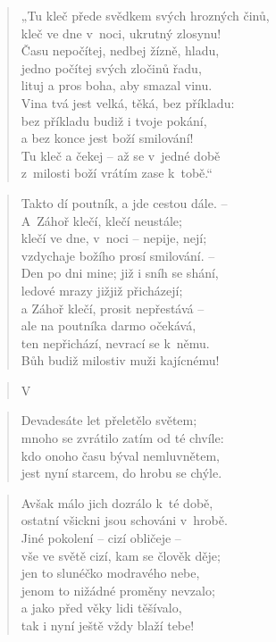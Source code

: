 \begin{verse}
„Tu kleč přede svědkem svých hrozných činů, \\
kleč ve dne v~noci, ukrutný zlosynu! \\
Času nepočítej, nedbej žízně, hladu, \\
jedno počítej svých zločinů řadu, \\
lituj a pros boha, aby smazal vinu. \\
Vina tvá jest velká, těká, bez příkladu: \\
bez příkladu budiž i tvoje pokání, \\
a bez konce jest boží smilování! \\
Tu kleč a čekej -- až se v~jedné době \\
z~milosti boží vrátím zase k~tobě.“
\end{verse}

\begin{verse}
Takto dí poutník, a jde cestou dále. -- \\
A~Záhoř klečí, klečí neustále; \\
klečí ve dne, v~noci -- nepije, nejí; \\
vzdychaje božího prosí smilování. -- \\
Den po dni mine; již i sníh se shání, \\
ledové mrazy jižjiž přicházejí; \\
a Záhoř klečí, prosit nepřestává -- \\
ale na poutníka darmo očekává, \\
ten nepřichází, nevrací se k~němu. \\
Bůh budiž milostiv muži kajícnému!
\end{verse}

\begin{verse}
V~\end{verse}

\begin{verse}
Devadesáte let přeletělo světem; \\
mnoho se zvrátilo zatím od té chvíle: \\
kdo onoho času býval nemluvnětem, \\
jest nyní starcem, do hrobu se chýle.
\end{verse}

\begin{verse}
Avšak málo jich dozrálo k~té době, \\
ostatní všickni jsou schováni v~hrobě. \\
Jiné pokolení -- cizí obličeje -- \\
vše ve světě cizí, kam se člověk děje; \\
jen to slunéčko modravého nebe, \\
jenom to nižádné proměny nevzalo; \\
a jako před věky lidi těšívalo, \\
tak i nyní ještě vždy blaží tebe!
\end{verse}

